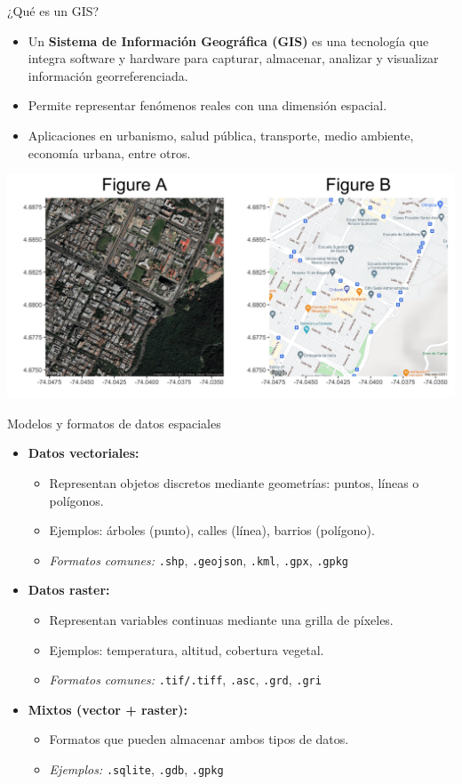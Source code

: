 \documentclass{beamer}
\begin{document}
\begin{frame}{¿Qué es un GIS?}
\begin{itemize}
    \item Un \textbf{Sistema de Información Geográfica (GIS)} es una tecnología que integra software y hardware para capturar, almacenar, analizar y visualizar información georreferenciada.
    \item Permite representar fenómenos reales con una dimensión espacial.
    \item Aplicaciones en urbanismo, salud pública, transporte, medio ambiente, economía urbana, entre otros.
\end{itemize}
\vspace{0.8em}
\centering
\includegraphics[width=0.7\linewidth]{figures/gis_intro.png}
\end{frame}

\begin{frame}{Modelos y formatos de datos espaciales}
\small
\begin{itemize}
\item \textbf{Datos vectoriales:}
\begin{itemize}
    \item Representan objetos discretos mediante geometrías: puntos, líneas o polígonos.
    \item Ejemplos: árboles (punto), calles (línea), barrios (polígono).
    \item \textit{Formatos comunes:} \texttt{.shp}, \texttt{.geojson}, \texttt{.kml}, \texttt{.gpx}, \texttt{.gpkg}
\end{itemize}
\item \textbf{Datos raster:}
\begin{itemize}
    \item Representan variables continuas mediante una grilla de píxeles.
    \item Ejemplos: temperatura, altitud, cobertura vegetal.
    \item \textit{Formatos comunes:} \texttt{.tif/.tiff}, \texttt{.asc}, \texttt{.grd}, \texttt{.gri}
\end{itemize}
\item \textbf{Mixtos (vector + raster):}
\begin{itemize}
    \item Formatos que pueden almacenar ambos tipos de datos.
    \item \textit{Ejemplos:} \texttt{.sqlite}, \texttt{.gdb}, \texttt{.gpkg}
\end{itemize}
\end{itemize}
\end{frame}
\end{document}
